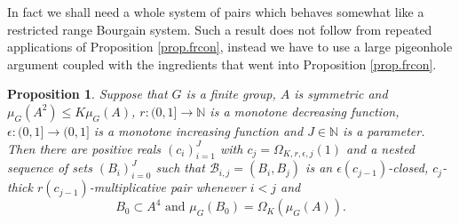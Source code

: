 \documentclass[12pt]{amsart}
\numberwithin{equation}{section}
\theoremstyle{plain}
\newtheorem{proposition}[subsection]{Proposition}
\theoremstyle{definition}
\renewcommand{\leq}{\leqslant}
\newcommand{\N}{\mathbb{N}}
\begin{document}
In fact we shall need a whole system of pairs which behaves somewhat like a restricted range Bourgain system.  Such a result does not follow from repeated applications of Proposition \ref{prop.frcon}, instead we have to use a large pigeonhole argument coupled with the ingredients that went into Proposition \ref{prop.frcon}. 
\begin{proposition}\label{prop.regapp}
Suppose that $G$ is a finite group, $A$ is symmetric and $\mu_G(A^2) \leq K\mu_G(A)$, $r:(0,1]\rightarrow \N$ is a monotone decreasing function, $\epsilon:(0,1]\rightarrow (0,1]$ is a monotone increasing function and $J \in \N$ is a parameter.  Then there are positive reals $(c_i)_{i=1}^J$ with $c_j=\Omega_{K,r,\epsilon,j}(1)$ and a nested sequence of sets $(B_i)_{i=0}^J$ such that $\mathcal{B}_{i,j}=(B_i,B_j)$ is an $\epsilon(c_{j-1})$-closed, $c_j$-thick $r(c_{j-1})$-multiplicative pair whenever $i<j$ and
\begin{equation*}
B_0 \subset A^4\textrm{ and } \mu_G(B_0)=\Omega_K(\mu_G(A)).
\end{equation*}
\end{proposition}
\end{document}
